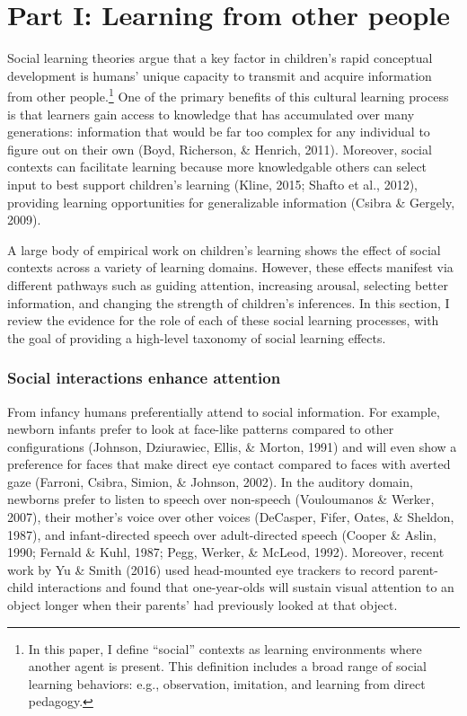 \documentclass[a4paper,man,apacite,floatsintext]{apa6}
\begin{document}
\section{Part I: Learning from other
people}\label{part-i-learning-from-other-people}

Social learning theories argue that a key factor in children's rapid
conceptual development is humans' unique capacity to transmit and
acquire information from other people.\footnote{In this paper, I define
  ``social'' contexts as learning environments where another agent is
  present. This definition includes a broad range of social learning
  behaviors: e.g., observation, imitation, and learning from direct
  pedagogy.} One of the primary benefits of this cultural learning
process is that learners gain access to knowledge that has accumulated
over many generations: information that would be far too complex for any
individual to figure out on their own (Boyd, Richerson, \& Henrich,
2011). Moreover, social contexts can facilitate learning because more
knowledgable others can select input to best support children's learning
(Kline, 2015; Shafto et al., 2012), providing learning opportunities for
generalizable information (Csibra \& Gergely, 2009).

A large body of empirical work on children's learning shows the effect
of social contexts across a variety of learning domains. However, these
effects manifest via different pathways such as guiding attention,
increasing arousal, selecting better information, and changing the
strength of children's inferences. In this section, I review the
evidence for the role of each of these social learning processes, with
the goal of providing a high-level taxonomy of social learning effects.

\subsubsection{Social interactions enhance
attention}\label{social-interactions-enhance-attention}

From infancy humans preferentially attend to social information. For
example, newborn infants prefer to look at face-like patterns compared
to other configurations (Johnson, Dziurawiec, Ellis, \& Morton, 1991)
and will even show a preference for faces that make direct eye contact
compared to faces with averted gaze (Farroni, Csibra, Simion, \&
Johnson, 2002). In the auditory domain, newborns prefer to listen to
speech over non-speech (Vouloumanos \& Werker, 2007), their mother's
voice over other voices (DeCasper, Fifer, Oates, \& Sheldon, 1987), and
infant-directed speech over adult-directed speech (Cooper \& Aslin,
1990; Fernald \& Kuhl, 1987; Pegg, Werker, \& McLeod, 1992). Moreover,
recent work by Yu \& Smith (2016) used head-mounted eye trackers to
record parent-child interactions and found that one-year-olds will
sustain visual attention to an object longer when their parents' had
previously looked at that object.
\end{document}
